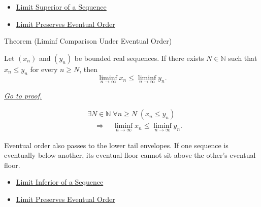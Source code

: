 \begin{dependencies}
\begin{itemize}
  \item \hyperref[def:limsup-sequence]{Limit Superior of a Sequence}
  \item \hyperref[thm:limit-preserves-eventual-order]{Limit Preserves Eventual Order}
\end{itemize}
\end{dependencies}


\begin{theorembox}{Theorem (Liminf Comparison Under Eventual Order)}
\begin{theorem}
\label{thm:liminf-comparison-under-eventual-order}
Let $(x_n)$ and $(y_n)$ be bounded real sequences. If there exists
$N\in\mathbb{N}$ such that $x_n\le y_n$ for every $n\ge N$, then
\[
  \liminf_{n\to\infty}x_n
  \le
  \liminf_{n\to\infty}y_n.
\]

\smallskip
\noindent
\hyperref[prf:liminf-comparison-under-eventual-order]{\textit{Go to proof.}}
\end{theorem}
\end{theorembox}

\begin{remark*}
\[
\begin{aligned}
&\exists N\in\mathbb{N}\;\forall n\ge N\;(x_n\le y_n)\\
&\quad\Longrightarrow\quad
\liminf_{n\to\infty}x_n
\le
\liminf_{n\to\infty}y_n.
\end{aligned}
\]
\end{remark*}

\begin{remark*}[Interpretation]
Eventual order also passes to the lower tail envelopes. If one sequence is
eventually below another, its eventual floor cannot sit above the other's
eventual floor.
\end{remark*}

\begin{dependencies}
\begin{itemize}
  \item \hyperref[def:liminf-sequence]{Limit Inferior of a Sequence}
  \item \hyperref[thm:limit-preserves-eventual-order]{Limit Preserves Eventual Order}
\end{itemize}
\end{dependencies}

